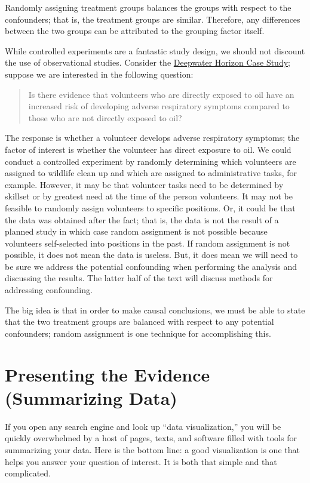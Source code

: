 \documentclass[]{book}
\theoremstyle{definition}
\theoremstyle{definition}
\theoremstyle{definition}
\theoremstyle{remark}
\let\BeginKnitrBlock\begin \let\EndKnitrBlock\end
\begin{document}
\BeginKnitrBlock{rmdkeyidea}
Randomly assigning treatment groups balances the groups with respect to
the confounders; that is, the treatment groups are similar. Therefore,
any differences between the two groups can be attributed to the grouping
factor itself.
\EndKnitrBlock{rmdkeyidea}

While controlled experiments are a fantastic study design, we should not
discount the use of observational studies. Consider the
\protect\hyperlink{CaseDeepwater}{Deepwater Horizon Case Study}; suppose
we are interested in the following question:

\begin{quote}
Is there evidence that volunteers who are directly exposed to oil have
an increased risk of developing adverse respiratory symptoms compared to
those who are not directly exposed to oil?
\end{quote}

The response is whether a volunteer develops adverse respiratory
symptoms; the factor of interest is whether the volunteer has direct
exposure to oil. We could conduct a controlled experiment by randomly
determining which volunteers are assigned to wildlife clean up and which
are assigned to administrative tasks, for example. However, it may be
that volunteer tasks need to be determined by skillset or by greatest
need at the time of the person volunteers. It may not be feasible to
randomly assign volunteers to specific positions. Or, it could be that
the data was obtained after the fact; that is, the data is not the
result of a planned study in which case random assignment is not
possible because volunteers self-selected into positions in the past. If
random assignment is not possible, it does not mean the data is useless.
But, it does mean we will need to be sure we address the potential
confounding when performing the analysis and discussing the results. The
latter half of the text will discuss methods for addressing confounding.

The big idea is that in order to make causal conclusions, we must be
able to state that the two treatment groups are balanced with respect to
any potential confounders; random assignment is one technique for
accomplishing this.

\chapter{Presenting the Evidence (Summarizing Data)}\label{Summaries}

If you open any search engine and look up ``data visualization,'' you
will be quickly overwhelmed by a host of pages, texts, and software
filled with tools for summarizing your data. Here is the bottom line: a
good visualization is one that helps you answer your question of
interest. It is both that simple and that complicated.
\end{document}
